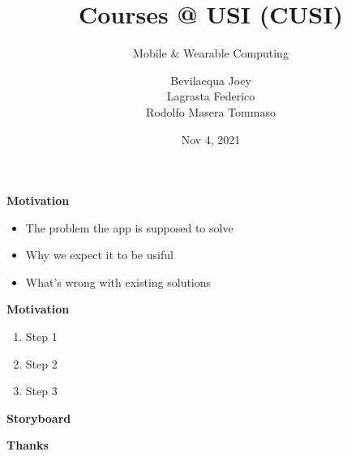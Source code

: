 \documentclass[t,aspectratio=1610]{beamer}
\title{Courses @ USI (CUSI)}
\subtitle{Mobile \& Wearable Computing}
\author{Bevilacqua Joey \\ Lagrasta Federico \\ Rodolfo Masera Tommaso}
\institute{Universit\`a della Svizzera Italiana\\ Faculty of Informatics\\ \href{http://www.unisi.ch}{www.unisi.ch}}
\date{Nov 4, 2021}
\begin{document}
{

\begin{frame}
\maketitle
\end{frame}
}

{

\begin{frame}
\textbf{Motivation} \\

\begin{itemize}
\item The problem the app is supposed to solve
\item Why we expect it to be usiful
\item What's wrong with existing solutions
\end{itemize}
\end{frame}
}

{
\begin{frame}
\textbf{Motivation} \\

\begin{enumerate}
\item Step 1
\item Step 2
\item Step 3
\end{enumerate}
\end{frame}
}

{
\begin{frame}
\textbf{Storyboard} \\

\end{frame}
}

{

\begin{frame}
\textbf{Thanks} \\

\end{frame}
}
\end{document}

